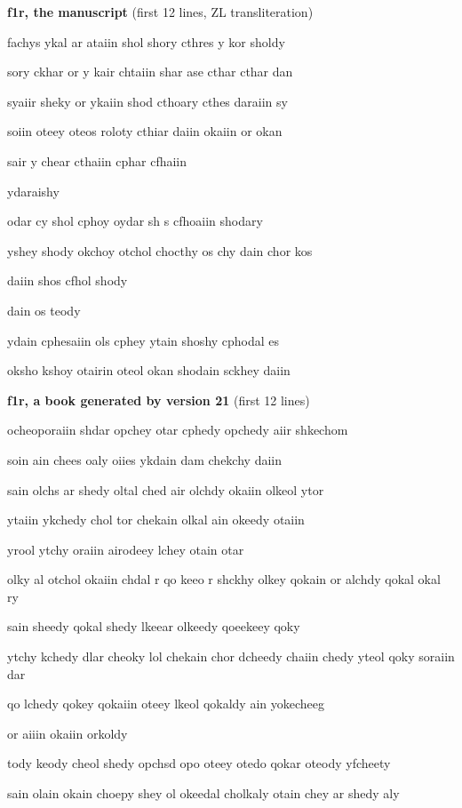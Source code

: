 \begin{minipage}{\linewidth}
\textbf{f1r, the manuscript} (first 12 lines, ZL transliteration)\par\medskip
{\voyfont\large\raggedright\setlength{\parskip}{2pt}
fachys ykal ar ataiin shol shory cthres y kor sholdy\par
sory ckhar or y kair chtaiin shar ase cthar cthar dan\par
syaiir sheky or ykaiin shod cthoary cthes daraiin sy\par
soiin oteey oteos roloty cthiar daiin okaiin or okan\par
sair y chear cthaiin cphar cfhaiin\par
ydaraishy\par
odar cy shol cphoy oydar sh s cfhoaiin shodary\par
yshey shody okchoy otchol chocthy os chy dain chor kos\par
daiin shos cfhol shody\par
dain os teody\par
ydain cphesaiin ols cphey ytain shoshy cphodal es\par
oksho kshoy otairin oteol okan shodain sckhey daiin
\par}
\vspace{8mm}
\textbf{f1r, a book generated by version 21} (first 12 lines)\par\medskip
{\voyfont\large\raggedright\setlength{\parskip}{2pt}
ocheoporaiin shdar opchey otar cphedy opchedy aiir shkechom\par
soin ain chees oaly oiies ykdain dam chekchy daiin\par
sain olchs ar shedy oltal ched air olchdy okaiin olkeol ytor\par
ytaiin ykchedy chol tor chekain olkal ain okeedy otaiin\par
yrool ytchy oraiin airodeey lchey otain otar\par
olky al otchol okaiin chdal r qo keeo r shckhy olkey qokain or alchdy qokal okal ry\par
sain sheedy qokal shedy lkeear olkeedy qoeekeey qoky\par
ytchy kchedy dlar cheoky lol chekain chor dcheedy chaiin chedy yteol qoky soraiin dar\par
qo lchedy qokey qokaiin oteey lkeol qokaldy ain yokecheeg\par
or aiiin okaiin orkoldy\par
tody keody cheol shedy opchsd opo oteey otedo qokar oteody yfcheety\par
sain olain okain choepy shey ol okeedal cholkaly otain chey ar shedy aly
\par}
\end{minipage}
